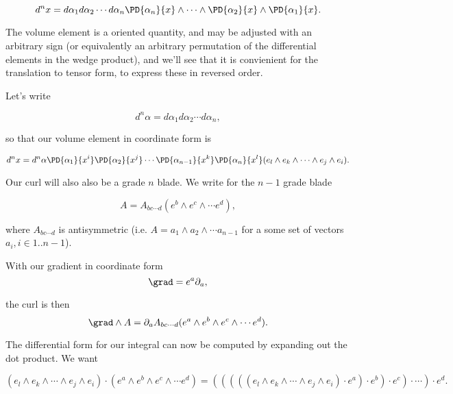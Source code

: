 \begin{equation}\label{eqn:stokesTensor:n}
d^n x
=
d\alpha_1
d\alpha_2
\cdots
d\alpha_n
\PD{\alpha_n}{x} \wedge
\cdots
\wedge
\PD{\alpha_2}{x}
\wedge
\PD{\alpha_1}{x}.
\end{equation}

The volume element is a oriented quantity, and may be adjusted with an arbitrary sign (or equivalently an arbitrary permutation of the differential elements in the wedge product), and we'll see that it is convienient for the translation to tensor form, to express these in reversed order.

Let's write

\begin{equation}\label{eqn:stokesTensor:n}
d^n \alpha = d\alpha_1 d\alpha_2 \cdots d\alpha_n,
\end{equation}

so that our volume element in coordinate form is

\begin{equation}\label{eqn:stokesTensor:n}
d^n x = d^n \alpha
\PD{\alpha_1}{x^i}
\PD{\alpha_2}{x^j}
\cdots
\PD{\alpha_{n-1}}{x^k}
\PD{\alpha_n}{x^l}
( e_l \wedge e_k \wedge \cdots \wedge e_j \wedge e_i ).
\end{equation}

Our curl will also also be a grade $n$ blade.  We write for the $n-1$ grade blade

\begin{equation}\label{eqn:stokesTensor:n}
A = A_{b c \cdots d} (e^b \wedge e^c \wedge \cdots e^d),
\end{equation}

where $A_{b c \cdots d}$ is antisymmetric (i.e. $A = a_1 \wedge a_2 \wedge \cdots a_{n-1}$ for a some set of vectors $a_i, i \in 1 .. n-1$).

With our gradient in coordinate form
\begin{equation}\label{eqn:stokesTensor:n}
\grad = e^a \partial_a,
\end{equation}

the curl is then
\begin{equation}\label{eqn:stokesTensor:n}
\grad \wedge A = \partial_a A_{b c \cdots d} (e^a \wedge e^b \wedge e^c \wedge \cdots e^d).
\end{equation}

The differential form for our integral can now be computed by expanding out the dot product.  We want

\begin{equation}\label{eqn:stokesTensor:n}
( e_l \wedge e_k \wedge \cdots \wedge e_j \wedge e_i )
\cdot
(e^a \wedge e^b \wedge e^c \wedge \cdots e^d)
=
((((( e_l \wedge e_k \wedge \cdots \wedge e_j \wedge e_i ) \cdot e^a ) \cdot e^b ) \cdot e^c ) \cdot \cdots ) \cdot e^d.
\end{equation}

